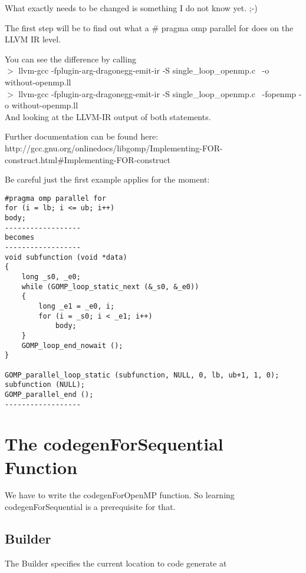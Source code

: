 \documentclass[a4paper,10pt]{article}
\begin{document}
                                              What exactly needs to be changed is something I do not know yet. ;-)

                                              The first step will be to find out what a \# pragma omp parallel for does on the LLVM IR level.

                                              You can see the difference by calling\\
                                              $>$ llvm-gcc -fplugin-arg-dragonegg-emit-ir -S single\_loop\_openmp.c \
                                                   -o without-openmp.ll\\
                                              $>$ llvm-gcc -fplugin-arg-dragonegg-emit-ir -S single\_loop\_openmp.c \
                                                        -fopenmp -o without-openmp.ll\\

                                                        And looking at the LLVM-IR output of both statements.

                                                        Further documentation can be found here:
                                                        http://gcc.gnu.org/onlinedocs/libgomp/Implementing-FOR-construct.html\#Implementing-FOR-construct

                                                        Be careful just the first example applies for the moment:


\begin{verbatim}
#pragma omp parallel for
for (i = lb; i <= ub; i++)
body;
------------------
becomes
------------------
void subfunction (void *data)
{
    long _s0, _e0;
    while (GOMP_loop_static_next (&_s0, &_e0))
    {
        long _e1 = _e0, i;
        for (i = _s0; i < _e1; i++)
            body;
    }
    GOMP_loop_end_nowait ();
}

GOMP_parallel_loop_static (subfunction, NULL, 0, lb, ub+1, 1, 0);
subfunction (NULL);
GOMP_parallel_end ();
------------------
\end{verbatim}
\section{The codegenForSequential Function}
We have to write the codegenForOpenMP function. So learning codegenForSequential is a prerequisite for that.
\subsection{Builder}
The Builder specifies the current location to code generate at
\end{document}
